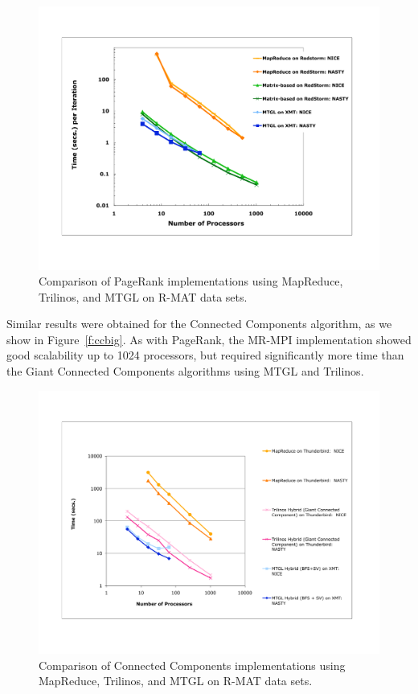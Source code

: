 \begin{figure}[h!]
\includegraphics[width=\textwidth]{fig_pagerank_big.pdf}
\caption{Comparison of PageRank implementations using MapReduce,
Trilinos, and MTGL on R-MAT data sets.}
\label{f:prbig}
\end{figure}

Similar results were obtained for the Connected Components algorithm, as
we show in Figure~\ref{f:ccbig}.  As with PageRank, the MR-MPI implementation
showed good scalability up to 1024 processors, but required significantly
more time than the Giant Connected Components algorithms using MTGL and
Trilinos.

\begin{figure}[h!]
\includegraphics[width=\textwidth]{fig_cc_big.pdf}
\caption{Comparison of Connected Components implementations using MapReduce,
Trilinos, and MTGL on R-MAT data sets.}
\label{f:prbig}
\end{figure}

